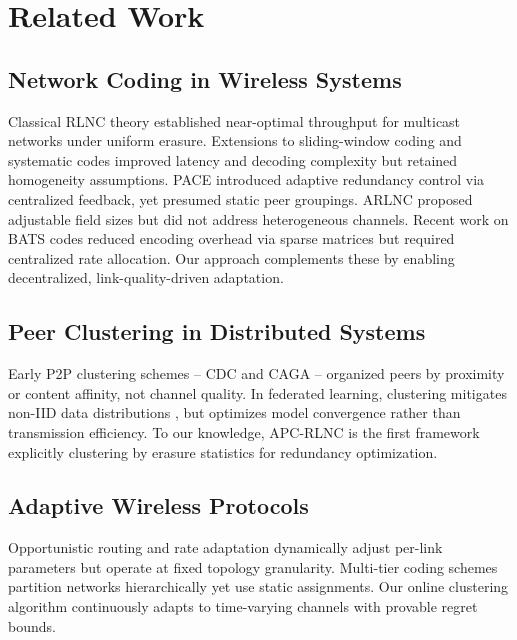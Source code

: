 \documentclass[journal]{IEEEtran}
\begin{document}
\section{Related Work}
\label{sec:related}

\subsection{Network Coding in Wireless Systems}
Classical RLNC theory \cite{ho2006,fragouli2007} established near-optimal throughput for multicast networks under uniform erasure. Extensions to sliding-window coding \cite{landon2025} and systematic codes \cite{shrader2009} improved latency and decoding complexity but retained homogeneity assumptions. PACE \cite{pandi2017} introduced adaptive redundancy control via centralized feedback, yet presumed static peer groupings. ARLNC \cite{dilanchian2024} proposed adjustable field sizes but did not address heterogeneous channels. Recent work on BATS codes \cite{fan2023} reduced encoding overhead via sparse matrices but required centralized rate allocation. Our approach complements these by enabling decentralized, link-quality-driven adaptation.

\subsection{Peer Clustering in Distributed Systems}
Early P2P clustering schemes -- CDC \cite{ramaswamy2005} and CAGA \cite{chinis2011} -- organized peers by proximity or content affinity, not channel quality. In federated learning, clustering mitigates non-IID data distributions \cite{soliman2020}, but optimizes model convergence rather than transmission efficiency. To our knowledge, APC-RLNC is the first framework explicitly clustering by erasure statistics for redundancy optimization.

\subsection{Adaptive Wireless Protocols}
Opportunistic routing \cite{biswas2005} and rate adaptation \cite{holland2001} dynamically adjust per-link parameters but operate at fixed topology granularity. Multi-tier coding schemes \cite{nguyen2009} partition networks hierarchically yet use static assignments. Our online clustering algorithm continuously adapts to time-varying channels with provable regret bounds.
\end{document}
